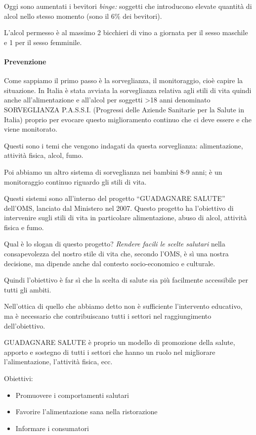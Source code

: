 Oggi sono aumentati i bevitori \emph{binge:} soggetti che introducono
elevate quantità di alcol nello stesso momento (sono il 6\% dei
bevitori).

L'alcol permesso è al massimo 2 bicchieri di vino a giornata per il
sesso maschile e 1 per il sesso femminile.

\paragraph{Prevenzione}

Come sappiamo il primo passo è la sorveglianza, il monitoraggio, cioè
capire la situazione. In Italia è stata avviata la sorveglianza relativa
agli stili di vita quindi anche all'alimentazione e all'alcol per
soggetti \textgreater{}18 anni denominato SORVEGLIANZA P.A.S.S.I.
(Progressi delle Aziende Sanitarie per la Salute in Italia) proprio per
evocare questo miglioramento continuo che ci deve essere e che viene
monitorato.

Questi sono i temi che vengono indagati da questa sorveglianza:
alimentazione, attività fisica, alcol, fumo.

Poi abbiamo un altro sistema di sorveglianza nei bambini 8-9 anni; è un
monitoraggio continuo riguardo gli stili di vita.

Questi sistemi sono all'interno del progetto ``GUADAGNARE SALUTE''
dell'OMS, lanciato dal Ministero nel 2007. Questo progetto ha
l'obiettivo di intervenire sugli stili di vita in particolare
alimentazione, abuso di alcol, attività fisica e fumo.

Qual è lo slogan di questo progetto? \emph{Rendere facili le scelte
salutari} nella consapevolezza del nostro stile di vita che, secondo
l'OMS, è sì una nostra decisione, ma dipende anche dal contesto
socio-economico e culturale.

Quindi l'obiettivo è far sì che la scelta di salute sia più facilmente
accessibile per tutti gli ambiti.

Nell'ottica di quello che abbiamo detto non è sufficiente l'intervento
educativo, ma è necessario che contribuiscano tutti i settori nel
raggiungimento dell'obiettivo.

GUADAGNARE SALUTE è proprio un modello di promozione della salute,
apporto e sostegno di tutti i settori che hanno un ruolo nel migliorare
l'alimentazione, l'attività fisica, ecc.

Obiettivi:

\begin{itemize}
\item
  Promuovere i comportamenti salutari
\item
  Favorire l'alimentazione sana nella ristorazione
\item
  Informare i consumatori
\end{itemize}

